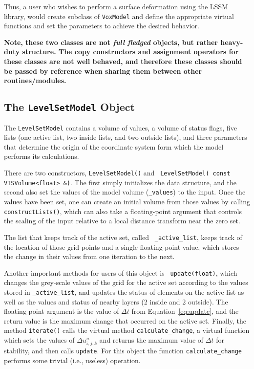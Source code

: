 Thus, a user who wishes to perform a surface deformation using the
LSSM library, would create subclass of {\tt VoxModel} and define the
appropriate virtual functions and set the parameters to achieve the
desired behavior.

{\bf Note, these two classes are not {\em full fledged} objects, but
rather heavy-duty structure.  The
copy constructors and assignment operators for these classes are not
well behaved, and therefore these classes should be passed by
reference when sharing them between other routines/modules.}

\subsection{The {\tt LevelSetModel} Object}
The {\tt LevelSetModel} contains a volume of values, a volume of
status flags, five lists (one active list, two inside lists, and two
outside lists), and three parameters that determine the origin of the
coordinate system form which the model performs its calculations.

There are two constructors, {\tt LevelSetModel()} and {\tt
LevelSetModel( const VISVolume<float> \&)}.  The first simply
initializes the data structure, and the second also set the values of
the model volume ({\tt \_values}) to the input.   Once the values have
been set, one can create an initial volume from those values by
calling {\tt constructLists()}, which can also take a floating-point
argument that controls the scaling of the input relative to a local
distance transform near the zero set.

The list that keeps track of the active set, called {\tt
\_active\_list}, keeps track of the location of those grid points and a
single floating-point value, which stores the change in their values
from one iteration to the next.

Another important methods for users of this object is {\tt
update(float)}, which changes the grey-scale values of the grid for
the active set according to the values stored in {\tt \_active\_list},
and updates the status of elements on the active list as well as the
values and status of nearby layers (2 inside and 2 outside).  The
floating point argument is the value of $\Delta t$ from
Equation~\ref{eq:update}, and the return value is the maximum change
that occurred on the active set.  Finally, the method {\tt iterate()}
calls the virtual method {\tt calculate\_change}, a virtual function
which sets the values
of $\Delta u^{n}_{i, j, k}$ and returns the maximum value of $\Delta
t$ for stability, and then calls {\tt update}.  For this object the
function {\tt calculate\_change} performs some trivial (i.e., useless)
operation.

